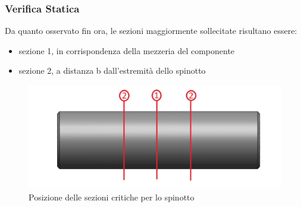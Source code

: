 \subsubsection{Verifica Statica}
Da quanto osservato fin ora, le sezioni maggiormente sollecitate risultano essere:
\begin{itemize}
    \item sezione 1, in corrispondenza della mezzeria del componente
    \item sezione 2, a distanza b dall'estremità dello spinotto 
\end{itemize}
\begin{figure}[h]
    \centering
    \includegraphics[scale=0.3]{Immagini/SezioniCriticheSpinotto.png}
    \caption{Posizione delle sezioni critiche per lo spinotto}
    \label{fig:SezioniCriticheSpinotto}
\end{figure}
